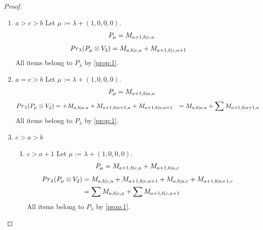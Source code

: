 \documentclass[12pt,a4paper]{article}
\begin{document}
\begin{proof}
\begin{enumerate}
\item $a>c>b$
        Let $\mu:=\lambda + (1,0,0,0) $. 
\begin{equation}\notag
  \begin{aligned}
      P_{\mu} =M_{a+1,b|c,a}
  \end{aligned}
\end{equation}
\begin{equation}\notag
  \begin{aligned}
  Pr_{\lambda}(P_\mu \otimes V_2) &=
M_{a,b|c,a}
+M_{a+1,b|c,a+1}
  \end{aligned}
\end{equation}
All items belong to $P_\lambda$ by \cref{prop:1}.
  
\item $a=c>b$
        Let $\mu:=\lambda + (1,0,0,0) $. 
\begin{equation}\notag
  \begin{aligned}
      P_{\mu} =
M_{a+1,b|a,a}
  \end{aligned}
\end{equation}
\begin{equation}\notag
  \begin{aligned}
  Pr_{\lambda}(P_\mu \otimes V_2) &=
+M_{a,b|a,a}
+M_{a+1,b|a+1,a}
+M_{a+1,b|a,a+1}
                                  &=
 M_{a,b|a,a}
+\sum M_{a+1,b|a+1,a}
  \end{aligned}
\end{equation}
All items belong to $P_\lambda$ by \cref{prop:1}.
  
\item $c>a>b$
  \begin{enumerate}
    \item $c>a+1$
        Let $\mu:=\lambda + (1,0,0,0) $. 
\begin{equation}\notag
  \begin{aligned}
      P_{\mu} =
M_{a+1,b|c,a}
+M_{a+1,b|a,c}
  \end{aligned}
\end{equation}
\begin{equation}\notag
  \begin{aligned}
  Pr_{\lambda}(P_\mu \otimes V_2) &=
M_{a,b|c,a}
+M_{a+1,b|c,a+1}
+M_{a,b|a,c}
+M_{a+1,b|a+1,c} \\
                                  &=
\sum M_{a,b|c,a}
+\sum M_{a+1,b|c,a+1}
  \end{aligned}
\end{equation}
All items belong to $P_\lambda$ by \cref{prop:1}.
    

\end{enumerate}
\end{enumerate}
\end{proof}
\end{document}
